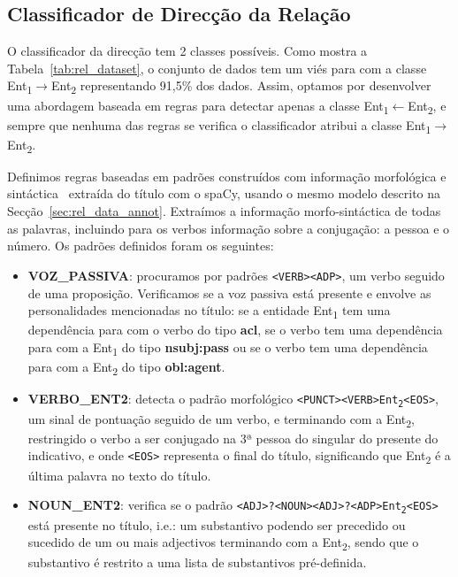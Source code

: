 \documentclass[a4paper, twocolumn, 11pt, twoside]{article}
\begin{document}
\subsection{Classificador de Direcção da Relação}
\label{subsec:rel_direction}

O classificador da direcção tem 2 classes possíveis. Como mostra a Tabela~\ref{tab:rel_dataset}, o conjunto de dados tem um viés para com a classe Ent\textsubscript{1}$\rightarrow$Ent\textsubscript{2} representando 91,5\% dos dados. Assim, optamos por desenvolver uma abordagem baseada em regras para detectar apenas a classe Ent\textsubscript{1}$\leftarrow$Ent\textsubscript{2}, e sempre que nenhuma das regras se verifica o classificador atribui a classe Ent\textsubscript{1}$\rightarrow$Ent\textsubscript{2}.

Definimos regras baseadas em padrões construídos com informação morfológica e sintáctica~\citep{nivre-etal-2020-universal} extraída do título com o spaCy, usando o mesmo modelo descrito na Secção~\ref{sec:rel_data_annot}. Extraímos a informação morfo-sintáctica de todas as palavras, incluindo para os verbos informação sobre a conjugação: a pessoa e o número. Os padrões definidos foram os seguintes:

\begin{itemize}

\item \textbf{VOZ\_PASSIVA}: procuramos por padrões \texttt{<VERB><ADP>}, um verbo seguido de uma proposição. Verificamos se a voz passiva está presente e envolve as personalidades mencionadas no título: se a entidade Ent\textsubscript{1} tem uma dependência para com o verbo do tipo \textbf{acl}, se o verbo tem uma dependência para com a Ent\textsubscript{1} do tipo \textbf{nsubj:pass} ou se o verbo tem uma dependência para com a Ent\textsubscript{2} do tipo \textbf{obl:agent}. 

\item \textbf{VERBO\_ENT2}: detecta o padrão morfológico \texttt{<PUNCT><VERB>Ent\textsubscript{2}<EOS>}, um sinal de pontuação seguido de um verbo, e terminando com a Ent\textsubscript{2}, restringido o verbo a ser conjugado na 3ª pessoa do singular do presente do indicativo, e onde \texttt{<EOS>} representa o final do título, significando que Ent\textsubscript{2} é a última palavra no texto do título.

\item \textbf{NOUN\_ENT2}: verifica se o padrão \texttt{<ADJ>?<NOUN><ADJ>?<ADP>Ent\textsubscript{2}<EOS>} está presente no título, i.e.: um substantivo podendo ser precedido ou sucedido de um ou mais adjectivos terminando com a Ent\textsubscript{2}, sendo que o substantivo é restrito a uma lista de substantivos pré-definida.
\end{itemize}
\end{document}
